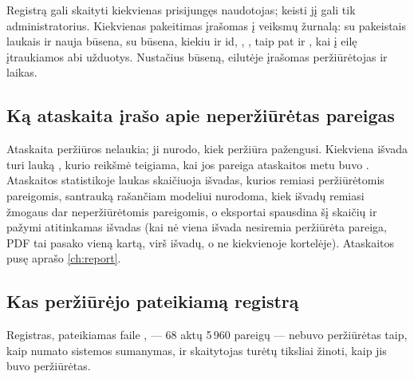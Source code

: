 Registrą gali skaityti kiekvienas prisijungęs naudotojas; keisti jį gali tik administratorius.
Kiekvienas pakeitimas įrašomas į veiksmų žurnalą:  su pakeistais laukais
ir nauja būsena,  su būsena, kiekiu ir id, ,
, taip pat  ir , kai
į eilę įtraukiamos abi užduotys. Nustačius būseną, eilutėje įrašomas peržiūrėtojas ir laikas.

\subsection{Ką ataskaita įrašo apie neperžiūrėtas pareigas}

Ataskaita peržiūros nelaukia; ji nurodo, kiek peržiūra pažengusi. Kiekviena išvada turi
lauką , kurio reikšmė teigiama, kai jos pareiga ataskaitos metu buvo
. Ataskaitos statistikoje laukas  skaičiuoja išvadas,
kurios remiasi peržiūrėtomis pareigomis, santrauką rašančiam modeliui nurodoma, kiek išvadų
remiasi žmogaus dar neperžiūrėtomis pareigomis, o eksportai spausdina šį skaičių ir pažymi
atitinkamas išvadas (kai nė viena išvada nesiremia peržiūrėta pareiga, PDF tai pasako vieną kartą,
virš išvadų, o ne kiekvienoje kortelėje). Ataskaitos pusę aprašo \cref{ch:report}.

\subsection{Kas peržiūrėjo pateikiamą registrą}\label{sec:obligations:shipped}

Registras, pateikiamas faile , --- 68 aktų 5\,960 pareigų --- nebuvo
peržiūrėtas taip, kaip numato sistemos sumanymas, ir skaitytojas turėtų tiksliai žinoti, kaip jis
buvo peržiūrėtas.

